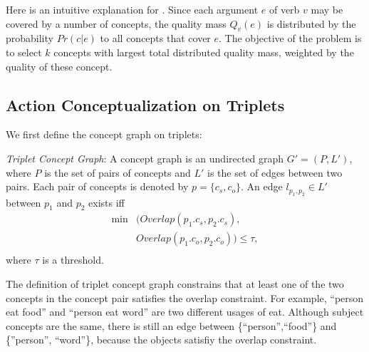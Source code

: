 Here is an intuitive explanation for . 
Since each argument $e$  of verb $v$ may be covered by a number of concepts, 
the quality mass $Q_v(e)$ is distributed by the probability $Pr(c|e)$ to 
all concepts that cover $e$. The objective of the problem is to select 
$k$ concepts with largest total distributed quality mass, weighted by the 
quality of these concept.

\subsection{Action Conceptualization on Triplets}
We first define the concept graph on
triplets:
\begin{definition}
\emph{Triplet Concept Graph}: A concept graph is an
undirected graph $G'=(P,L')$, where
$P$ is the set of pairs of concepts and $L'$ is the set of edges between
two pairs. Each pair of concepts is denoted by $p=\{c_s, c_o\}$.
An edge $l_{p_1,p_2}\in L'$ between $p_1$ and $p_2$ exists iff
\begin{equation}
\begin{split}
\min{}&(Overlap(p_1.c_s, p_2.c_s), \\
&Overlap(p_1.c_o, p_2.c_o))\leq\tau,\\
\end{split}
\end{equation}
where $\tau$ is a threshold.
\end{definition}
The definition of triplet concept graph constrains that at least one of the two 
concepts in the concept pair satisfies the overlap constraint. For example, 
``person eat food'' and ``person eat word'' are two different usages of eat.
Although subject concepts are the same, there is still
an edge between \{``person'',``food''\} and \{''person'', ``word''\}, because the 
objects satisfiy the overlap constraint.

